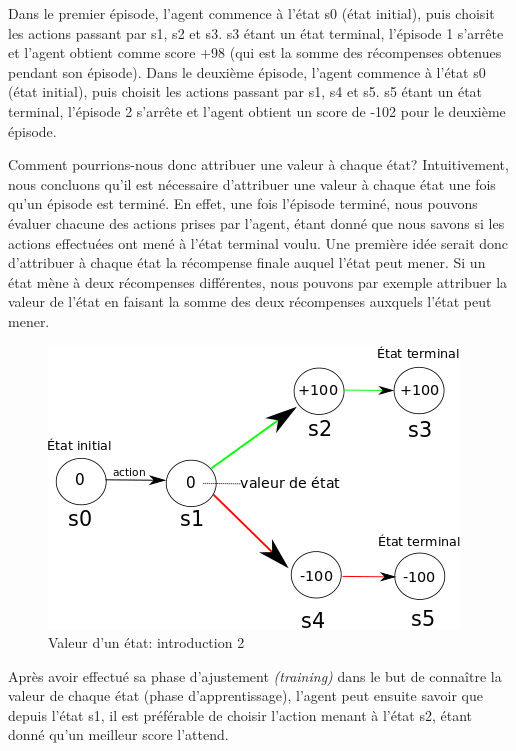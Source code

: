\documentclass[11pt,a4paper]{report}
\begin{document}
    \par Dans le premier épisode, l'agent commence à l'état s0 (état initial), puis choisit les actions passant par s1, s2 et s3. s3 étant un état terminal, l'épisode 1 s'arrête et l'agent obtient comme score +98 (qui est la somme des récompenses obtenues pendant son épisode). Dans le deuxième épisode, l'agent commence à l'état s0 (état initial), puis choisit les actions passant par s1, s4 et s5. s5 étant un état terminal, l'épisode 2 s'arrête et l'agent obtient un score de -102 pour le deuxième épisode. 
    
    \par Comment pourrions-nous donc attribuer une valeur à chaque état? Intuitivement, nous concluons qu'il est nécessaire d'attribuer une valeur à chaque état une fois qu'un épisode est terminé. En effet, une fois l'épisode terminé, nous pouvons évaluer chacune des actions prises par l'agent, étant donné que nous savons si les actions effectuées ont mené à l'état terminal voulu. Une première idée serait donc d'attribuer à chaque état la récompense finale auquel l'état peut mener. Si un état mène à deux récompenses différentes, nous pouvons par exemple attribuer la valeur de l'état en faisant la somme des deux récompenses auxquels l'état peut mener. 
    
    \begin{figure}[!h]
    \center
    \includegraphics[scale=0.60]{ressources/introduction_function_value_2.png}
    \caption{Valeur d'un état: introduction 2}
    \end{figure}
    
    \par Après avoir effectué sa phase d'ajustement \textit{(training)} dans le but de connaître la valeur de chaque état (phase d'apprentissage), l'agent peut ensuite savoir que depuis l'état s1, il est préférable de choisir l'action menant à l'état s2, étant donné qu'un meilleur score l'attend.
    
\end{document}
